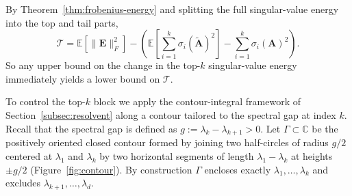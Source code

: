 \documentclass{article}
\newcommand{\Ex}[1]{\mbox{}\mathbb{E}\left[#1\right]}
\newcommand{\Ab}{\mathbf{A}}
\newcommand{\Eb}{\mathbf{E}}
\newcommand{\Abtil}{\tilde{\Ab}}
\newcommand{\Tcal}{\mathcal{T}}
\newcommand{\BlackBox}{\rule{1.5ex}{1.5ex}}  %
\newenvironment{proof}{\par\noindent{\bf Proof\ }}{\hfill\BlackBox\par\medskip}
\newcommand{\tr}{\mathop{\mathrm{tr}}}
\newcommand{\rbr}[1]{\left(#1\right)}
\begin{document}

By Theorem~\ref{thm:frobenius-energy} and splitting the full singular-value energy into the top and tail parts,
\begin{equation}\label{eq:tail-top-identity}
    \Tcal = \Ex{\|\Eb\|_F^2} - \rbr{\Ex{\sum_{i=1}^{k}\sigma_i(\Abtil)^2} - \sum_{i=1}^{k}\sigma_i(\Ab)^2}.
\end{equation}
So any upper bound on the change in the top-$k$ singular-value energy immediately yields a lower bound on $\Tcal$.


To control the top-$k$ block we apply the contour-integral framework of Section~\ref{subsec:resolvent} along a contour tailored to the spectral gap at index $k$. Recall that the spectral gap is defined as $g := \lambda_k - \lambda_{k+1} > 0.$ Let $\Gamma \subset \mathbb{C}$ be the positively oriented closed contour formed by joining two half-circles of radius $g/2$ centered at $\lambda_1$ and $\lambda_k$ by two horizontal segments of length $\lambda_1 - \lambda_k$ at heights $\pm g/2$ (Figure~\ref{fig:contour}). By construction $\Gamma$ encloses exactly $\lambda_1, \ldots, \lambda_k$ and excludes $\lambda_{k+1}, \ldots, \lambda_d$.
\end{document}
